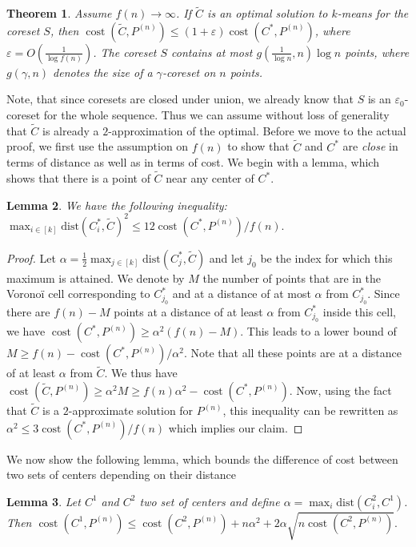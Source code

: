 \documentclass[a4paper,11pt,oneside,english,onecolumn]{article}
\newtheorem{theorem}{Theorem}
\newtheorem{lemma}[theorem]{Lemma}
\theoremstyle{definition}
\newcommand{\dist}[0]{\ensuremath{\mathrm{dist}}}
\DeclareMathOperator{\cost}{cost}
\newcommand{\eps}{\ensuremath{\varepsilon}}
\begin{document}
\begin{theorem}
\label{th:improvingClustering}
Assume $f(n) \rightarrow \infty$. If $\tilde C$ is an optimal solution to $k$-means for the coreset $S$, then $\cost(\tilde C, P^{(n)}) \leq (1 + \eps) \cost(C^*, P^{(n)})$, where $\eps = O(\frac{1}{\log f(n)})$. The coreset $S$ contains at most $g(\frac{1}{\log n}, n) \log n$ points, where $g(\gamma, n)$ denotes the size of a $\gamma$-coreset on $n$ points.

\end{theorem}
\bigskip
Note, that since coresets are closed under union, we already know that $S$ is an $\eps_0$-coreset for the whole sequence. Thus we can assume without loss of generality that $\tilde C$ is already a $2$-approximation of the optimal. Before we move to the actual proof, we first use the assumption on $f(n)$ to show that $\tilde C$ and $C^*$ are \emph{close} in terms of distance as well as in terms of cost. We begin with a lemma, which shows that there is a point of $\tilde C$ near any center of $C^*$.
\begin{lemma}
\label{lemma:distanceToCenters}
We have the following inequality:
$\max_{i \in [k]} \dist(C^*_i, \tilde C)^2 \leq 12\cost(C^*, P^{(n)})/f(n).$
\end{lemma}
\begin{proof}
Let $\alpha = \frac 1 2 \max_{j \in [k]} \dist(C^*_j, \tilde C) $ and let $j_0$ be the index for which this maximum is attained. We denote by $M$ the number of points that are in the Vorono\"i cell corresponding to $C^*_{j_0}$ and at a distance of at most $\alpha$ from $C^*_{j_0}$. Since there are $f(n) - M$ points at a distance of at least $\alpha$ from $C^*_{j_0}$ inside this cell, we have $\cost(C^*, P^{(n)}) \geq \alpha^2 \left( f(n) - M \right).$ This leads to a lower bound of $M \geq f(n) - \cost(C^*, P^{(n)})/\alpha^2.$
Note that all these points are at a distance of at least $\alpha$ from $\tilde C$. We thus have $\cost(\tilde C, P^{(n)}) \geq \alpha^2 M \geq f(n) \alpha^2 - \cost(C^*, P^{(n)}).$
Now, using the fact that $\tilde C$ is a $2$-approximate solution for $P^{(n)}$, this inequality can be rewritten as $\alpha^2 \leq 3 \cost(C^*, P^{(n)})/f(n)$
which implies our claim.
\end{proof}

We now show the following lemma, which bounds the difference of cost between two sets of centers depending on their distance
\begin{lemma}
\label{lemma:ineqCostMean}
Let $C^1$ and $C^2$ two set of centers and define $\alpha = \max_i \dist(C^2_i, C^1)$. Then $\cost(C^1, P^{(n)}) \leq \cost(C^2, P^{(n)}) + n \alpha^2 + 2\alpha \sqrt{n\cost(C^2, P^{(n)})}.$
\end{lemma}
\end{document}
